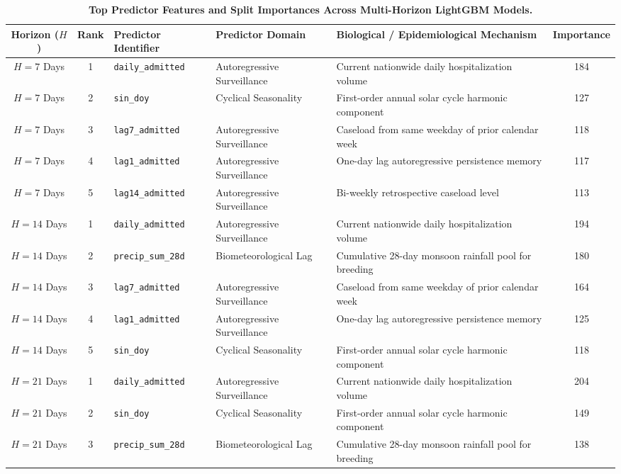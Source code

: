 \documentclass[11pt,a4paper]{article}
\begin{document}
\begin{table}[t]
\centering
\small
\caption{\textbf{Top Predictor Features and Split Importances Across Multi-Horizon LightGBM Models.}}
\label{tab:table6}
\begin{tabular*}{\textwidth}{@{\extracolsep{\fill}}cclllc@{}}
\toprule
\textbf{Horizon ($H$)} & \textbf{Rank} & \textbf{Predictor Identifier} & \textbf{Predictor Domain} & \textbf{Biological / Epidemiological Mechanism} & \textbf{Importance} \\
\midrule
$H=7$ Days & 1 & \texttt{daily\_admitted} & Autoregressive Surveillance & Current nationwide daily hospitalization volume & 184 \\
$H=7$ Days & 2 & \texttt{sin\_doy} & Cyclical Seasonality & First-order annual solar cycle harmonic component & 127 \\
$H=7$ Days & 3 & \texttt{lag7\_admitted} & Autoregressive Surveillance & Caseload from same weekday of prior calendar week & 118 \\
$H=7$ Days & 4 & \texttt{lag1\_admitted} & Autoregressive Surveillance & One-day lag autoregressive persistence memory & 117 \\
$H=7$ Days & 5 & \texttt{lag14\_admitted} & Autoregressive Surveillance & Bi-weekly retrospective caseload level & 113 \\
\midrule
$H=14$ Days & 1 & \texttt{daily\_admitted} & Autoregressive Surveillance & Current nationwide daily hospitalization volume & 194 \\
$H=14$ Days & 2 & \texttt{precip\_sum\_28d} & Biometeorological Lag & Cumulative 28-day monsoon rainfall pool for breeding & 180 \\
$H=14$ Days & 3 & \texttt{lag7\_admitted} & Autoregressive Surveillance & Caseload from same weekday of prior calendar week & 164 \\
$H=14$ Days & 4 & \texttt{lag1\_admitted} & Autoregressive Surveillance & One-day lag autoregressive persistence memory & 125 \\
$H=14$ Days & 5 & \texttt{sin\_doy} & Cyclical Seasonality & First-order annual solar cycle harmonic component & 118 \\
\midrule
$H=21$ Days & 1 & \texttt{daily\_admitted} & Autoregressive Surveillance & Current nationwide daily hospitalization volume & 204 \\
$H=21$ Days & 2 & \texttt{sin\_doy} & Cyclical Seasonality & First-order annual solar cycle harmonic component & 149 \\
$H=21$ Days & 3 & \texttt{precip\_sum\_28d} & Biometeorological Lag & Cumulative 28-day monsoon rainfall pool for breeding & 138 \\

\end{tabular*}
\end{table}
\end{document}
